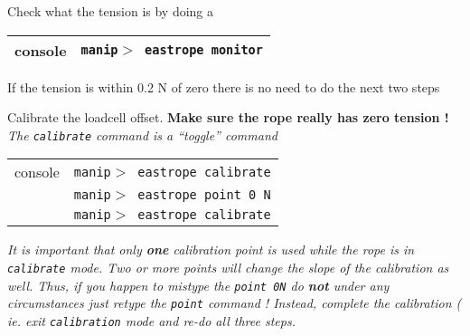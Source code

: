 \begin{enumerate}


\checkitem Check what the tension is by doing a   
  \begin{center}
  \begin{tabular}{|l|l|}
  \hline
  console & {\tt manip$>$ eastrope monitor} \\
  \hline
  \end{tabular}
  \end{center}
 If the tension is within 0.2 N of zero there is no need to do the next two steps


\checkitem Calibrate the loadcell offset. {\bf Make sure the rope really has zero tension !} \\
\small
{\em The {\tt calibrate} command is a ``toggle'' command}
\normalsize

  \begin{center}
  \begin{tabular}{|l|l|}
  \hline
  console & {\tt manip$>$ eastrope calibrate} \\
          & {\tt manip$>$ eastrope point 0 N} \\
          & {\tt manip$>$ eastrope calibrate} \\
  \hline
  \end{tabular}
  \end{center}
\small
  {\em It is important that only {\bf one} calibration point is used while the rope is in
{\tt calibrate} mode. Two or more points will change the slope of the calibration as well.
Thus, if you happen to mistype the {\tt point 0N} do {\bf not } under any circumstances
just retype the {\tt point}  command !  Instead, complete the calibration ( ie. exit {\tt calibration}  mode and re-do all three steps.}
\normalsize 


\end{enumerate}
